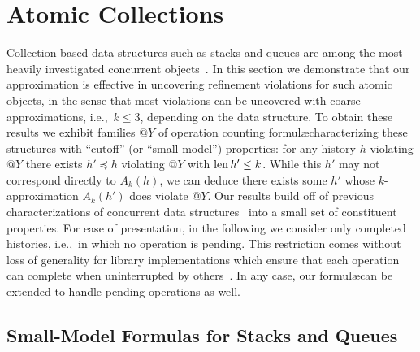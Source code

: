 \section{Atomic Collections}
\label{sec:containers}

Collection-based data structures such as stacks and queues are among the most
heavily investigated concurrent objects~\cite{chapter/cds/MoirS07}. In this
section we demonstrate that our approximation is effective in uncovering
refinement violations for such atomic objects, in the sense that most
violations can be uncovered with coarse approximations, i.e.,~$k\le 3$,
depending on the data structure. To obtain these results we exhibit families
$@Y$ of operation counting formul\ae characterizing these structures with
``cutoff'' (or ``small-model'') properties: for any history $h$ violating $@Y$
there exists $h' \preceq h$ violating $@Y$ with $\operatorname{len} h' \le k$. While this
$h'$ may not correspond directly to $A_k(h)$, we can deduce there exists some
$h'$ whose $k$-approximation $A_k(h')$ does violate $@Y$. Our results build off
of previous characterizations of concurrent data
structures~\cite{conf/tacas/AbdullaHHJR13, conf/concur/HenzingerSV13} into a
small set of constituent properties. For ease of presentation, in the following
we consider only completed histories, i.e.,~in which no operation is pending.
This restriction comes without loss of generality for library implementations
which ensure that each operation can complete when uninterrupted by
others~\cite{conf/concur/HenzingerSV13}. In any case, our formul\ae can be
extended to handle pending operations as well.


\subsection{Small-Model Formulas for Stacks and Queues}
\label{sec:containers:small}

